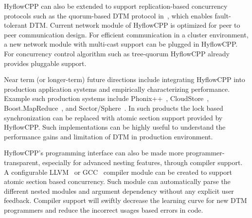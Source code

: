 \documentclass[12pt,english]{report}
\begin{document}
HyflowCPP can also be extended to support replication-based concurrency protocols such as the quorum-based DTM protocol in~\cite{Zhang:2011:QRF:2183536.2183539}, which enables fault-tolerant DTM. Current network module of HyflowCPP is optimized for peer to peer communication design. For efficient communication in a cluster environment, a new network module with multi-cast support can be plugged in HyflowCPP. For concurrency control algorithm such as tree-quorum HyflowCPP already provides pluggable support.

Near term (or longer-term) future directions include integrating HyflowCPP into production application systems and empirically characterizing performance. Example such production systems include Phonix++~\cite{Phonixpp}, CloudStore~\cite{CloudStore}, Boost.MapReduce~\cite{Boost:MapReduce}, and Sector/Sphere~\cite{Sector:sphere}. In such products the lock based synchronization can be replaced with atomic section support provided by HyflowCPP. Such implementations can be highly useful to understand the performance gains and limitation of DTM in production environment.

HyflowCPP's programming interface can also be made more programmer-transparent, especially for advanced nesting features, through compiler support. A configurable LLVM~\cite{llvm} or GCC~\cite{gcc} compiler module can be created to support atomic section based concurrency. Such module can automatically parse the different nested modules and argument dependency without any explicit user feedback. Compiler support will swiftly decrease the learning curve for new DTM programmers and reduce the incorrect usages based errors in code.


\newpage
{}



\end{document}
